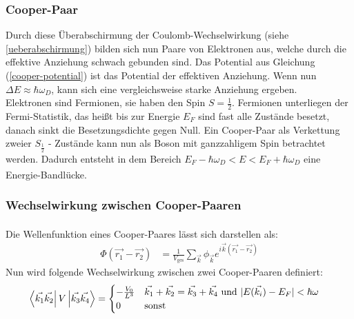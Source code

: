 \documentclass[12pt]{article}
\begin{document}
\subsubsection{Cooper-Paar}
Durch diese Überabschirmung der Coulomb-Wechselwirkung (siehe \ref{ueberabschirmung}) bilden sich nun Paare von Elektronen aus, welche durch die effektive Anziehung schwach gebunden sind. Das Potential aus Gleichung (\ref{cooper-potential}) ist das Potential der effektiven Anziehung. Wenn nun $\Delta E\approx\hbar\omega_D$, kann sich eine vergleichsweise starke Anziehung ergeben.\\

Elektronen sind Fermionen, sie haben den Spin $S=\frac12$. Fermionen unterliegen der Fermi-Statistik, das heißt bis zur Energie $E_F$ sind fast alle Zustände besetzt, danach sinkt die Besetzungsdichte gegen Null.
Ein Cooper-Paar als Verkettung zweier $S_\frac12$ - Zustände kann nun als Boson mit ganzzahligem Spin betrachtet werden. Dadurch entsteht in dem Bereich $E_F-\hbar\omega_D<E<E_F+\hbar\omega_D$ eine Energie-Bandlücke.\textsuperscript{\cite{anleitung}}
\subsubsection{Wechselwirkung zwischen Cooper-Paaren}
Die Wellenfunktion eines Cooper-Paares lässt sich darstellen als: \textsuperscript{\cite{anleitung}}
\begin{align}
	\Phi(\vec{r_1}-\vec{r_2})&=\frac1{V_{\mathrm{ges}}}\sum_{\vec k}\phi_{\vec k}e^{i\vec k(\vec{r_1}-\vec{r_2})}
\end{align}
Nun wird folgende Wechselwirkung zwischen zwei Cooper-Paaren definiert:
\begin{align}
	\bra{\vec{k_1}\vec{k_2}}V\ket{\vec{k_3}\vec{k_4}}&=\begin{cases}-\frac{V_0}{L^3}&\vec{k_1}+\vec{k_2}=\vec{k_3}+\vec{k_4} \text{ und }|E(\vec{k_i})-E_F|<\hbar\omega\\0&\text{sonst}\end{cases}
\end{align}
\end{document}
